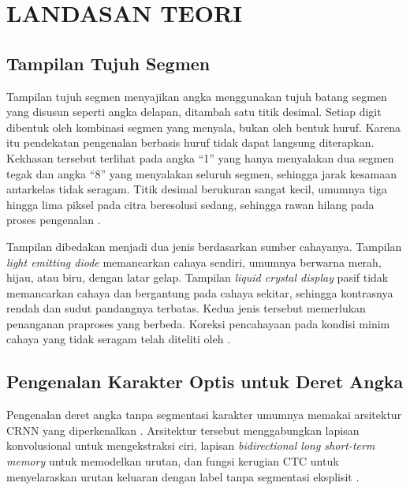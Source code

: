 
\chapter{LANDASAN TEORI}

\section{Tampilan Tujuh Segmen}

Tampilan tujuh segmen menyajikan angka menggunakan tujuh batang segmen yang
disusun seperti angka delapan, ditambah satu titik desimal. Setiap digit
dibentuk oleh kombinasi segmen yang menyala, bukan oleh bentuk huruf. Karena
itu pendekatan pengenalan berbasis huruf tidak dapat langsung diterapkan.
Kekhasan tersebut terlihat pada angka ``1'' yang hanya menyalakan dua segmen
tegak dan angka ``8'' yang menyalakan seluruh segmen, sehingga jarak kesamaan
antarkelas tidak seragam. Titik desimal berukuran sangat kecil, umumnya tiga
hingga lima piksel pada citra beresolusi sedang, sehingga rawan hilang pada
proses pengenalan \parencite{gushima2023automatic}.

Tampilan dibedakan menjadi dua jenis berdasarkan sumber cahayanya. Tampilan
\textit{light emitting diode} memancarkan cahaya sendiri, umumnya berwarna
merah, hijau, atau biru, dengan latar gelap. Tampilan \textit{liquid crystal
display} pasif tidak memancarkan cahaya dan bergantung pada cahaya sekitar,
sehingga kontrasnya rendah dan sudut pandangnya terbatas. Kedua jenis tersebut
memerlukan penanganan praproses yang berbeda. Koreksi pencahayaan pada kondisi
minim cahaya yang tidak seragam telah diteliti oleh \textcite{fu2026twolevel}.

\section{Pengenalan Karakter Optis untuk Deret Angka}

Pengenalan deret angka tanpa segmentasi karakter umumnya memakai arsitektur
CRNN yang diperkenalkan \textcite{shi2017crnn}. Arsitektur tersebut menggabungkan
lapisan konvolusional untuk mengekstraksi ciri, lapisan \textit{bidirectional
long short-term memory} untuk memodelkan urutan, dan fungsi kerugian CTC untuk
menyelaraskan urutan keluaran dengan label tanpa segmentasi eksplisit
\parencite{graves2006ctc}.


